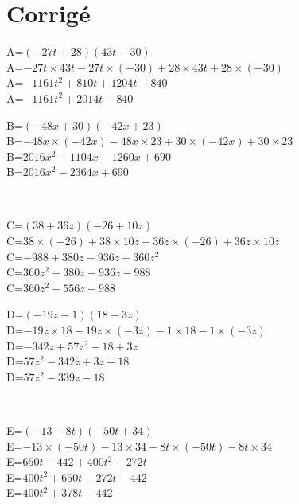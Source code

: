 \documentclass{article}%
\begin{document}
\section{Corrigé}%
\label{sec:Corrig}%
\begin{minipage}{0.5\textwidth}%
A=$(-27t+28)(43t-30)$\\%
A=$-27t \times 43t-27t \times (-30)+28 \times 43t+28 \times (-30)$\\%
A=$-1161t^2+810t+1204t-840$\\%
A=$-1161t^2+2014t-840$\\%
\end{minipage}%
\begin{minipage}{0.5\textwidth}%
B=$(-48x+30)(-42x+23)$\\%
B=$-48x \times (-42x)-48x \times 23+30 \times (-42x)+30 \times 23$\\%
B=$2016x^2-1104x-1260x+690$\\%
B=$2016x^2-2364x+690$\\%
\end{minipage}%
\\%
\begin{minipage}{0.5\textwidth}%
C=$(38+36z)(-26+10z)$\\%
C=$38 \times (-26)+38 \times 10z+36z \times (-26)+36z \times 10z$\\%
C=$-988+380z-936z+360z^2$\\%
C=$360z^2+380z-936z-988$\\%
C=$360z^2-556z-988$\\%
\end{minipage}%
\begin{minipage}{0.5\textwidth}%
D=$(-19z-1)(18-3z)$\\%
D=$-19z \times 18-19z \times (-3z)-1 \times 18-1 \times (-3z)$\\%
D=$-342z+57z^2-18+3z$\\%
D=$57z^2-342z+3z-18$\\%
D=$57z^2-339z-18$\\%
\end{minipage}%
\\%
\begin{minipage}{0.5\textwidth}%
E=$(-13-8t)(-50t+34)$\\%
E=$-13 \times (-50t)-13 \times 34-8t \times (-50t)-8t \times 34$\\%
E=$650t-442+400t^2-272t$\\%
E=$400t^2+650t-272t-442$\\%
E=$400t^2+378t-442$\\%
\end{minipage}%
\end{document}
